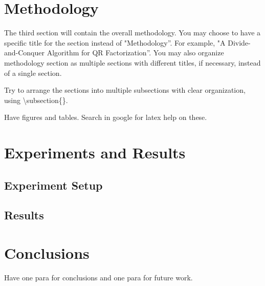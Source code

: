 \documentclass[conference]{IEEEtran}
\begin{document}
\section{Methodology}

The third section will contain the overall methodology. You may choose to have a specific title for the section instead of "Methodology''. For example, "A Divide-and-Conquer Algorithm for QR Factorization''.  You may also organize methodology section as multiple sections with different titles, if necessary, instead of a single section.

Try to arrange the sections into multiple subsections with clear organization, using \textbackslash subsection\{\}.

Have figures and tables. Search in google for latex help on these.

\section{Experiments and Results}

\subsection{Experiment Setup}

\subsection{Results}

\section{Conclusions}

Have one para for conclusions and one para for future work.



\end{document}
